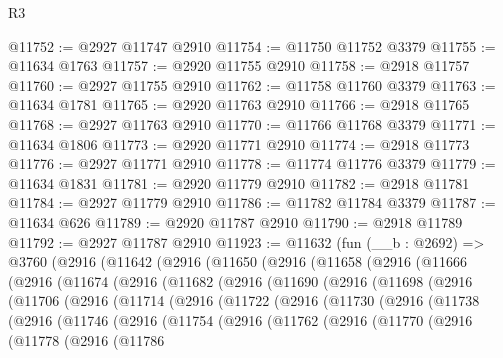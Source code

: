 \begin{lexlean}{R3}
\begin{coremodule}
@11752 := @2927 @11747 @2910
@11754 := @11750 @11752 @3379
@11755 := @11634 @1763
@11757 := @2920 @11755 @2910
@11758 := @2918 @11757
@11760 := @2927 @11755 @2910
@11762 := @11758 @11760 @3379
@11763 := @11634 @1781
@11765 := @2920 @11763 @2910
@11766 := @2918 @11765
@11768 := @2927 @11763 @2910
@11770 := @11766 @11768 @3379
@11771 := @11634 @1806
@11773 := @2920 @11771 @2910
@11774 := @2918 @11773
@11776 := @2927 @11771 @2910
@11778 := @11774 @11776 @3379
@11779 := @11634 @1831
@11781 := @2920 @11779 @2910
@11782 := @2918 @11781
@11784 := @2927 @11779 @2910
@11786 := @11782 @11784 @3379
@11787 := @11634 @626
@11789 := @2920 @11787 @2910
@11790 := @2918 @11789
@11792 := @2927 @11787 @2910
@11923 := @11632
    (fun (__b : @2692) =>
    @3760
      (@2916
        (@11642
          (@2916
            (@11650
              (@2916
                (@11658
                  (@2916
                    (@11666
                      (@2916
                        (@11674
                          (@2916
                            (@11682
                              (@2916
                                (@11690
                                  (@2916
                                    (@11698
                                      (@2916
                                        (@11706
                                          (@2916
                                            (@11714
                                              (@2916
                                                (@11722
                                                  (@2916
                                                    (@11730
                                                      (@2916
                                                        (@11738
                                                          (@2916
                                                            (@11746
                                                              (@2916
                                                                (@11754
                                                                  (@2916
                                                                    (@11762
                                                                      (@2916
                                                                        (@11770
                                                                          (@2916
                                                                            (@11778
                                                                              (@2916
                                                                                (@11786

\end{coremodule}
\end{lexlean}
